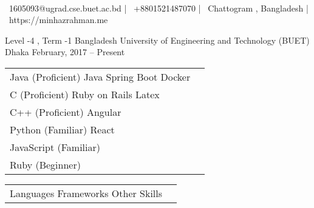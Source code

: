 \documentclass[]{awesome-cv}
\begin{document}
    
\begin{center}
	  \\
	\vspace{2mm}
	{\faEnvelope\ 1605093@ugrad.cse.buet.ac.bd} | {\faMobile\ +8801521487070} | {\faMapMarker\ Chattogram , Bangladesh} | {\faLink\ https://minhazrahman.me}
\end{center}
\begin{cventries}
	\cventry
	{Level -4 , Term -1}
	{Bangladesh University of Engineering and Technology (BUET)}
	{Dhaka}
	{February, 2017 – Present}
	{}
\end{cventries}

\vspace{-2mm}

\begin{cventries}
	\cventry
	{\def\arraystretch{1.15}{\begin{tabular}{ l l }
				Java (Proficient) \hspace{4.5cm} Java Spring Boot \hspace{5.5cm} Docker  & {\skill{ }} \\
				C (Proficient) \hspace{5cm} Ruby on Rails \hspace{5.8cm} Latex & {\skill{ }} \\
				C++ (Proficient) \hspace{5cm} Angular  & {\skill{ }} \\
				Python (Familiar) \hspace{5cm} React  & {\skill{ }} \\
				JavaScript (Familiar)  & {\skill{ }} \\
				Ruby (Beginner)  & {\skill{ }} \\
	\end{tabular}}}
	{\def\arraystretch{1.15}{\begin{tabular}{ l l }
		Languages \hspace{5cm} Frameworks \hspace{5cm} Other Skills  & {\skill{ }} \\
		\end{tabular}}}
	{}
	{}
	{}
	
\end{cventries}
\end{document}
